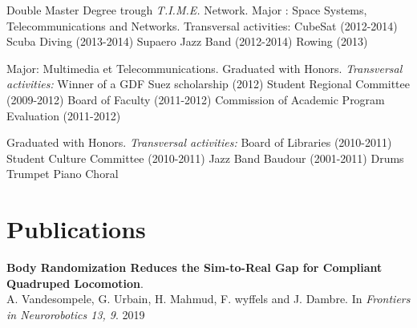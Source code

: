 \documentclass[a4paper]{deedy-resume} %
\begin{document}
\vspace{2pt}
Double Master Degree trough \textit{T.I.M.E.} Network. Major : Space Systems, Telecommunications and Networks.
Transversal activities: CubeSat (2012-2014) \textbullet{} Scuba Diving (2013-2014) \textbullet{} Supaero Jazz Band (2012-2014) \textbullet{} Rowing (2013)

\vspace{10pt}

\vspace{2pt}
Major: Multimedia et Telecommunications.
Graduated with Honors.
\textit{Transversal activities:} Winner of a GDF Suez scholarship (2012)  \textbullet{} Student Regional Committee (2009-2012) \textbullet{} Board of Faculty (2011-2012)  \textbullet{} Commission of Academic Program Evaluation (2011-2012)

\vspace{3pt}
Graduated with Honors.
\textit{Transversal activities:} Board of Libraries (2010-2011) \textbullet{} Student Culture Committee (2010-2011) \textbullet{} Jazz Band Baudour (2001-2011) \textbullet{} Drums \textbullet{} Trumpet \textbullet{} Piano \textbullet{} Choral

\pagebreak
\vspace*{0.1pt}


\section{Publications}
\vspace{5pt}

\textbf{Body Randomization Reduces the Sim-to-Real Gap for Compliant Quadruped Locomotion}. \\
A. Vandesompele, G. Urbain, H. Mahmud,  F. wyffels and J. Dambre.
In \textit{Frontiers in Neurorobotics 13, 9}. 2019
\end{document}
